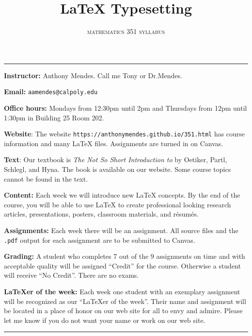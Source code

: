 \documentclass[10pt]{article}
\title{\LaTeX{} Typesetting}
\author{\textsc{mathematics 351 syllabus}}
\date{}
\begin{document}
\maketitle

\thispagestyle{empty}

\rule{\textwidth}{.01ex}

\textbf{Instructor:} Anthony Mendes.  Call me Tony or Dr.\@ Mendes.

\textbf{Email:} \texttt{aamendes@calpoly.edu}

\textbf{Office hours:} Mondays from 12:30pm until 2pm and Thursdays from 12pm until 1:30pm
in Building 25 Room 202.

\textbf{Website}: The website \texttt{https://anthonymendes.github.io/351.html} has course
information and many \LaTeX{} files.  Assignments are turned in on Canvas.

\textbf{Text}: Our textbook is \textsl{The Not So Short Introduction to \LaTeXe} by
Oetiker, Partl, Schlegl, and Hyna.  The book is available on our website.  Some course
topics cannot be found in the text.

\textbf{Content:} Each week we will introduce new \LaTeX{} concepts.  By the end of the
course, you will be able to use \LaTeX{} to create professional looking research articles,
presentations, posters, classroom materials, and r\'esum\'es.

\textbf{Assignments:} Each week there will be an assignment.  All source files and the
\texttt{.pdf} output for each assignment are to be submitted to Canvas.

\textbf{Grading:} A student who completes 7 out of the 9 assignments on time and with
acceptable quality will be assigned ``Credit'' for the course.  Otherwise a student will
receive ``No Credit''.  There are no exams.

\textbf{\LaTeX{er} of the week:} Each week one student with an exemplary assignment will
be recognized as our ``\LaTeX{er} of the week''.  Their name and assignment will be
located in a place of honor on our web site for all to envy and admire.  Please let me
know if you do not want your name or work on our web site.

\rule{\textwidth}{.02ex}
\end{document}

